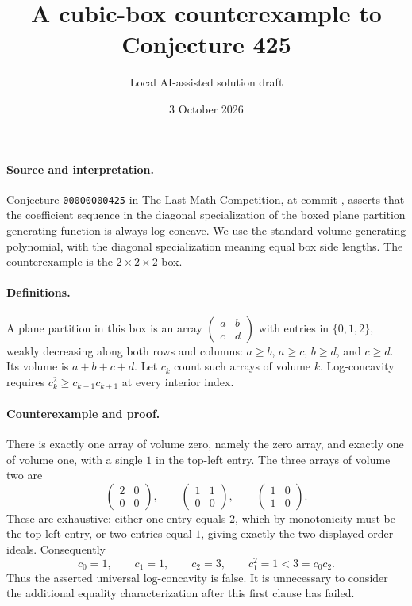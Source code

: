 \documentclass[10pt]{article}
\title{A cubic-box counterexample to Conjecture 425}
\author{Local AI-assisted solution draft}
\date{3 October 2026}
\makeatletter
\renewcommand{\maketitle}{\begin{center}
{\Large\bfseries\@title\par}\vspace{0.6em}
{\small\@author\par\@date}
\end{center}\vspace{0.5em}}
\makeatother
\begin{document}
\maketitle
\paragraph{Source and interpretation.}
Conjecture \texttt{00000000425} in The Last Math Competition, at commit
, asserts that the
coefficient sequence in the diagonal specialization of the boxed plane
partition generating function is always log-concave. We use the standard
volume generating polynomial, with the diagonal specialization meaning equal
box side lengths. The counterexample is the $2\times2\times2$ box.

\paragraph{Definitions.}
A plane partition in this box is an array
$\left(\begin{smallmatrix}a&b\\c&d\end{smallmatrix}\right)$ with entries in
$\{0,1,2\}$, weakly decreasing along both rows and columns:
$a\ge b$, $a\ge c$, $b\ge d$, and $c\ge d$.
Its volume is $a+b+c+d$. Let $c_k$ count such arrays of volume $k$.
Log-concavity requires $c_k^2\ge c_{k-1}c_{k+1}$ at every interior index.

\paragraph{Counterexample and proof.}
There is exactly one array of volume zero, namely the zero array, and exactly
one of volume one, with a single $1$ in the top-left entry. The three arrays
of volume two are
\[
\begin{pmatrix}2&0\\0&0\end{pmatrix},\qquad
\begin{pmatrix}1&1\\0&0\end{pmatrix},\qquad
\begin{pmatrix}1&0\\1&0\end{pmatrix}.
\]
These are exhaustive: either one entry equals $2$, which by monotonicity
must be the top-left entry, or two entries equal $1$, giving exactly the
two displayed order ideals. Consequently
\[
c_0=1,\qquad c_1=1,\qquad c_2=3,\qquad
c_1^2=1<3=c_0c_2.
\]
Thus the asserted universal log-concavity is false. It is unnecessary to
consider the additional equality characterization after this first clause
has failed.
\end{document}
